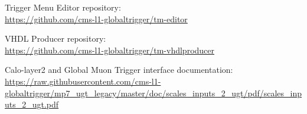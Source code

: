 \documentclass[11pt,a4paper,english,titlepage]{article}
\begin{document}
\doctitlepage{}



\doctoc{}



\doctables{}

\docfigures{}




% 

\begin{thebibliography}{00}

Trigger Menu Editor repository:\\
\url{https://github.com/cms-l1-globaltrigger/tm-editor}

VHDL Producer repository:\\
\url{https://github.com/cms-l1-globaltrigger/tm-vhdlproducer}

Calo-layer2 and Global Muon Trigger interface documentation:\\
\url{https://raw.githubusercontent.com/cms-l1-globaltrigger/mp7_ugt_legacy/master/doc/scales_inputs_2_ugt/pdf/scales_inputs_2_ugt.pdf}

\end{thebibliography}

\end{document}

